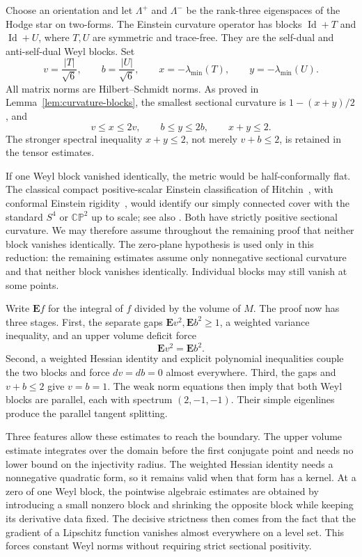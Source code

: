 Choose an orientation and let $\Lambda^+$ and $\Lambda^-$ be the
rank-three eigenspaces of the Hodge star on two-forms. The Einstein
curvature operator has blocks $\operatorname{Id}+T$ and
$\operatorname{Id}+U$, where $T,U$ are symmetric and trace-free.
They are the self-dual and anti-self-dual Weyl blocks. Set
\[
 v=\frac{|T|}{\sqrt6},\qquad b=\frac{|U|}{\sqrt6},\qquad
 x=-\lambda_{\min}(T),\qquad y=-\lambda_{\min}(U).
\]
All matrix norms are Hilbert--Schmidt norms. As proved in
Lemma~\ref{lem:curvature-blocks}, the smallest sectional curvature is
$1-(x+y)/2$, and
\[
 v\le x\le2v,\qquad b\le y\le2b,\qquad x+y\le2.
\]
The stronger spectral inequality $x+y\le2$, not merely $v+b\le2$,
is retained in the tensor estimates.

If one Weyl block vanished identically, the metric would be
half-conformally flat. The classical compact positive-scalar Einstein
classification of Hitchin~\cite{Hitchin1981}, with conformal Einstein
rigidity~\cite{Obata1962}, would identify our simply connected cover
with the standard $S^4$ or $\mathbb{CP}^2$ up to scale; see also
\cite[Remark~7]{Derdzinski1983}. Both have strictly positive sectional
curvature. We may therefore assume throughout the remaining proof that
neither block vanishes identically. The zero-plane hypothesis is used
only in this reduction: the remaining estimates assume only nonnegative
sectional curvature and that neither block vanishes identically.
Individual blocks may still vanish at some points.

Write $\mathbf E f$ for the integral of $f$ divided by the volume of $M$.
The proof now has three stages.
First, the separate gaps $\mathbf E v^2,\mathbf E b^2\ge1$,
a weighted variance inequality, and an upper volume deficit force
\[
 \mathbf E v^2=\mathbf E b^2.
\]
Second, a weighted Hessian identity and explicit polynomial inequalities
couple the two blocks and force $dv=db=0$ almost everywhere.
Third, the gaps and $v+b\le2$ give $v=b=1$. The weak norm equations
then imply that both Weyl blocks are parallel, each with spectrum
$(2,-1,-1)$. Their simple eigenlines produce the parallel tangent
splitting.

Three features allow these estimates to reach the boundary. The upper
volume estimate integrates over the domain before the first conjugate
point and needs no lower bound on the injectivity radius. The weighted
Hessian identity needs a nonnegative quadratic form, so it remains valid
when that form has a kernel. At a zero of one Weyl block, the pointwise
algebraic estimates are obtained by introducing a small nonzero block
and shrinking the opposite block while keeping its derivative data fixed.
The decisive strictness then comes from the fact that the gradient of a
Lipschitz function vanishes almost everywhere on a level set. This forces
constant Weyl norms without requiring strict sectional positivity.

